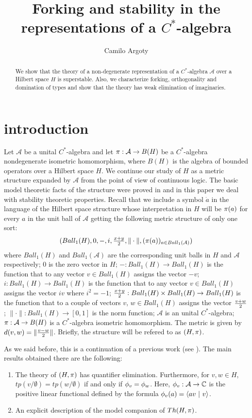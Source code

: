 \documentclass{amsart}
\title[Forking and stability in a $C^*$-algebra representation]{Forking and stability in the representations of a $C^*$-algebra}
\author{Camilo Argoty}
\date{}
\def\ben{\begin{enumerate}}\def\een{\end{enumerate}}
\def\A{\mathcal{A}}
\theoremstyle{definition}
\theoremstyle{remark}
\newcommand{\C}{\ensuremath{\mathbb{C}}}
\newcommand{\sfrac}[2]{\hbox{$\frac{#1}{#2}$}}
\newcommand{\half}[1][1]{\sfrac{#1}{2}}
\begin{document}
\begin{abstract}
We show that the theory of a non-degenerate representation of a $C^*$-algebra $\A$ over a Hilbert space $H$ is superstable. Also, we characterize forking, orthogonality and domination of types and show that the theory has weak elimination of imaginaries.
\end{abstract}

\maketitle




\section{introduction}

Let $\A$ be a unital $C^*$-algebra and let $\p:\A\to B(H)$ be a $C^*$-algebra nondegenerate isometric homomorphism, where $B(H)$ is the algebra of bounded operators over a Hilbert space $H$. We continue our study of $H$ as a metric structure expanded by $\A$ from the point of view of continuous logic. The basic model theoretic facts of the structure were proved in \cite{Ar} and in this paper we deal with stability theoretic properties. Recall that we include a symbol $\dot{a}$ in the language of the Hilbert space structure whose interpretation in $H$ will be $\pi(a)$ for every $a$ in the unit ball of $\A$ getting the following metric structure of only one sort: 
\[(Ball_1(H),0,-,i,\half[x+y],\|\cdot\|,(\p(a))_{a\in Ball_1(\A)})\] where $Ball_1(H)$  and $Ball_1(\A)$ are the corresponding unit balls in $H$ and $\A$ respectively; $0$ is the zero vector in $H$; $-: Ball_1(H)\to Ball_1(H)$ is the function that to any vector $v\in Ball_1(H)$ assigns the vector $-v$; $i: Ball_1(H)\to Ball_1(H)$ is the function that to any vector $v\in Ball_1(H)$ assigns the vector $iv$ where $i^2=-1$; $\half[x+y]: Ball_1(H)\times Ball_1(H)\to Ball_1(H)$ is the  function that to a couple of vectors $v$, $w\in Ball_1(H)$ assigns the vector $\half[v+w]$; $\|\cdot\|: Ball_1(H) \to [0, 1]$ is the norm function; $\A$ is an unital $C^*$-algebra; $\p:\A\to B(H)$ is a $C^*$-algebra isometric homomorphism. The metric is given by $d(v,w) =\|\half[v-w]\|$. Briefly, the structure will be refered to as $(H,\pi)$. 

As we said before, this is a continuation of a previous work (see \cite{Ar}). The main results obtained there are the following:
\ben
\item The theory of $(H,\pi)$ has quantifier elimination. Furthermore, for $v,w\in H$, $tp(v/\emptyset)=tp(w/\emptyset)$ if and only if $\phi_v=\phi_w$. Here, $\f_v:\A\to\C$ is the positive linear functional defined by the formula $\phi_v(a)=\langle av\ |\ v\rangle$.
\item An explicit description of the model companion of $Th(H,\pi)$.
\een
\end{document}
